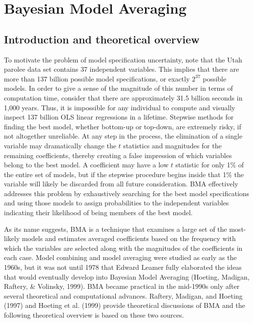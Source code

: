 \section{Bayesian Model Averaging}

\subsection{Introduction and theoretical overview}

To motivate the problem of model specification uncertainty, note that the Utah parolee data set contains 37 independent variables.  This implies that there are more than 137 billion possible model specifications, or exactly $2^{37}$ possible models.  In order to give a sense of the magnitude of this number in terms of computation time, consider that there are approximately 31.5 billion seconds in 1,000 years. Thus, it is impossible for any individual to compute and visually inspect 137 billion OLS linear regressions in a lifetime.  Stepwise methods for finding the best model, whether bottom-up or top-down, are extremely risky, if not altogether unreliable.  At any step in the process, the elimination of a single variable may dramatically change the $t$ statistics and magnitudes for the remaining coefficients, thereby creating a false impression of which variables belong to the best model.  A coefficient may have a low $t$ statistic for only 1\% of the entire set of models, but if the stepwise procedure begins inside that 1\% the variable will likely be discarded from all future consideration.  BMA effectively addresses this problem by exhaustively searching for the best model specifications and using those models to assign probabilities to the independent variables indicating their likelihood of being members of the best model.

As its name suggests, BMA is a technique that examines a large set of the most-likely models and estimates averaged coefficients based on the frequency with which the variables are selected along with the magnitudes of the coefficients in each case.  Model combining and model averaging were studied as early as the 1960s, but it was not until 1978 that Edward Leamer fully elaborated the ideas that would eventually develop into Bayesian Model Averaging (Hoeting, Madigan, Raftery, \& Volinsky, 1999).  BMA became practical in the mid-1990s only after several theoretical and computational advances.  Raftery, Madigan, and Hoeting (1997) and Hoeting et al. (1999) provide theoretical discussions of BMA and the following theoretical overview is based on these two sources.

